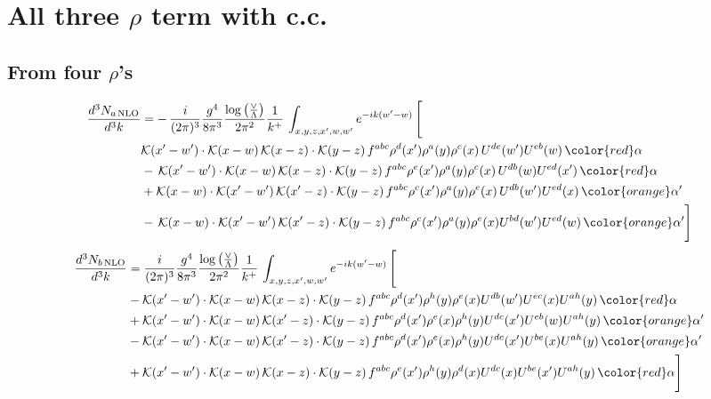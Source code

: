 \section{All three $\rho$ term with c.c.}
\subsection{From four $\rho$'s}
\begin{align}
    \frac{d^{3}N_{a\,\rm NLO}}{d^{3}k} & = -\,\frac{i}{(2\pi)^{3}}\frac{g^{4}}{8\pi^{3}}\frac{\log{\left(\frac{\vee}{\Lambda}\right)}}{2\pi^{2}} \frac{1}{k^{+}}\,\int_{x,y,z,x^{\prime},w,w^{\prime}}e^{-ik(w^{\prime}-w)}\, \Bigg[\notag \\ &  \mathcal{K}(x'-w')\cdot \mathcal{K}(x-w)\, \mathcal{K}(x-z)\cdot \mathcal{K}(y-z)\, f^{a b c} \rho^{d}(x') \rho^{a}(y) \rho^{c}(x)\,U^{d e}(w') U^{e b}(w)\, {\color{red} \alpha} \nonumber\\
    &  -\,\mathcal{K}(x'-w')\cdot \mathcal{K}(x-w)\, \mathcal{K}(x-z)\cdot \mathcal{K}(y-z)\, f^{a b c} \rho^{e}(x') \rho^{a}(y) \rho^{c}(x)\, U^{d b}(w) U^{e d}(x')\, {\color{red} \alpha}\nonumber\\
    & + \mathcal{K}(x-w)\cdot \mathcal{K}(x'-w')\, \mathcal{K}(x'-z)\cdot \mathcal{K}(y-z)\, f^{a b c} \rho^{c}(x') \rho^{a}(y) \rho^{e}(x)\,U^{d b}(w') U^{e d}(x)\, {\color{orange} \alpha'} \nonumber\\
    & -\,\mathcal{K}(x-w)\cdot \mathcal{K}(x'-w')\, \mathcal{K}(x'-z)\cdot \mathcal{K}(y-z)\, f^{a b c} \rho^{c}(x') \rho^{a}(y) \rho^{e}(x) U^{b d}(w') U^{e d}(w)\, {\color{orange} \alpha'}\Bigg]
\end{align}
\begin{align}
      \frac{d^{3}N_{b\,\rm NLO}}{d^{3}k} & = \frac{i}{(2\pi)^{3}}\frac{g^{4}}{8\pi^{3}}\frac{\log{\left(\frac{\vee}{\Lambda}\right)}}{2\pi^{2}} \frac{1}{k^{+}}\,\int_{x,y,z,x^{\prime},w,w^{\prime}}e^{-ik(w^{\prime}-w)}\, \Bigg[\notag \\ & - \mathcal{K}(x'-w')\cdot \mathcal{K}(x-w)\, \mathcal{K}(x-z)\cdot \mathcal{K}(y-z)\, f^{a b c} \rho^{d}(x') \rho^{h}(y) \rho^{e}(x) U^{d b}(w') U^{e c}(x) U^{a h}(y)\, {\color{red} \alpha}\nonumber\\
    &+ \mathcal{K}(x'-w')\cdot \mathcal{K}(x-w)\,\mathcal{K}(x'-z)\cdot \mathcal{K}(y-z)\, f^{a b c} \rho^{d}(x') \rho^{e}(x) \rho^{h}(y) U^{d c}(x') U^{e b}(w) U^{a h}(y)\, {\color{orange} \alpha'}\nonumber\\
    &- \mathcal{K}(x'-w')\cdot \mathcal{K}(x-w)\,\mathcal{K}(x'-z)\cdot \mathcal{K}(y-z)\, f^{a b c} \rho^{d}(x') \rho^{e}(x) \rho^{h}(y) U^{d c}(x') U^{b e}(x) U^{a h}(y)\, {\color{orange} \alpha'}\nonumber\\
    &+  \mathcal{K}(x'-w')\cdot \mathcal{K}(x-w)\, \mathcal{K}(x-z)\cdot \mathcal{K}(y-z)\, f^{a b c} \rho^{e}(x') \rho^{h}(y) \rho^{d}(x) U^{d c}(x) U^{b e}(x') U^{a h}(y)\, {\color{red} \alpha} \Bigg]
\end{align}
